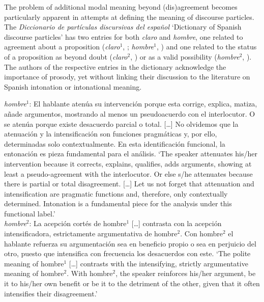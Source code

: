 The problem of additional modal meaning beyond (dis)agreement becomes particularly apparent in attempts at defining the meaning of discourse particles. The \textit{Diccionario de partículas discursivas del español} `Dictionary of Spanish discourse particles' has two entries for both \textit{claro} and \textit{hombre}, one related to agreement about a proposition (\textit{claro}$^1$, \cite{PonsBorderia.2011}; \textit{hombre}$^1$, \cite{BrizVillalba.2011}) and one related to the status of a proposition as beyond doubt (\textit{claro}$^2$, \cite{PonsBorderia.2011claro2}) or as a valid possibility (\textit{hombre}$^2$, \cite{BrizVillalba.2011hombre2}). The authors of the respective entries in the dictionary acknowledge the importance of prosody, yet without linking their discussion to the literature on Spanish intonation or intonational meaning.\largerpage

\begin{displayquote}
	\textit{hombre}$^1$: El hablante atenúa su intervención porque esta corrige, explica, matiza, añade argumentos, mostrando al menos un pseudoacuerdo con el interlocutor. O se atenúa porque existe desacuerdo parcial o total. [\ldots] No olvidemos que la atenuación y la intensificación son funciones pragmáticas y, por ello, determinadas solo contextualmente. En esta identificación funcional, la entonación es pieza fundamental para el análisis. \citep[31--32]{Briz.2012}
	\glt `The speaker attenuates his/her intervention because it corrects, explains, qualifies, adds arguments, showing at least a pseudo-agreement with the interlocutor. Or else s/he attenuates because there is partial or total disagreement. [\ldots] Let us not forget that attenuation and intensification are pragmatic functions and, therefore, only contextually determined. Intonation is a fundamental piece for the analysis under this functional label.'\medskip\\	
	\textit{hombre}$^2$: La acepción cortés de hombre$^1$ [\ldots] contrasta con la acepción intensificadora, estrictamente argumentativa de hombre$^2$. Con hombre$^2$ el hablante refuerza su argumentación sea en beneficio propio o sea en perjuicio del otro, puesto que intensifica con frecuencia los desacuerdos con este. \citep[36]{Briz.2012}
	\glt `The polite meaning of hombre$^1$ [\ldots] contrasts with the intensifying, strictly argumentative meaning of hombre$^2$. With hombre$^2$, the speaker reinforces his/her argument, be it to his/her own benefit or be it to the detriment of the other, given that it often intensifies their disagreement.'	
\end{displayquote}


